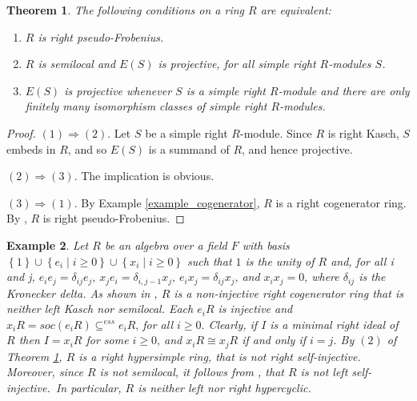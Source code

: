 \documentclass{amsart}
\newtheorem{theorem}{Theorem}[section]
\theoremstyle{plain}
\newtheorem{example}[theorem]{Example}
\numberwithin{equation}{section}
\begin{document}
\begin{theorem}
\label{Pseudo-Frobenius Rings in terms of E(S) being projective}
The following conditions on a ring $R$ are equivalent: 


\begin{enumerate}
\item $R$ is right pseudo-Frobenius.

\item $R$ is semilocal and $E (S)$ is projective, for all simple right $R$-modules $S$.

\item $E (S)$ is projective whenever $S$ is a simple right $R$-module and there are only finitely many isomorphism classes of simple right $R$-modules. \end{enumerate}
\end{theorem}


\begin{proof}
$(1) \Rightarrow (2)$. Let $S$ be a simple right $R$-module. Since $R$ is right Kasch, $S$ embeds in $R$, and so $E (S)$ is a summand of $R$, and hence projective. 

$(2) \Rightarrow (3)$. The implication is obvious. 

$(3) \Rightarrow (1)$. By Example \ref{example_cogenerator}, $R$ is a right cogenerator ring. By \cite[Theorem 19.25]{Lam},
$R$ is right pseudo-Frobenius. 
\end{proof}


\begin{example}
\cite[Example 2]{O3}\label{Osofsky's Example}
Let $R$ be an algebra over a field $F$ with basis $\left \{1\right \} \cup \left \{e_{i} \mid i \geq 0\right \} \cup \left \{x_{i} \mid i \geq 0\right \}$ such that $1$ is the unity of $R$ and, for all i and j, $e_{i} e_{j} =\delta _{i j} e_{j}\text{,}$ $x_{j} e_{i} =\delta _{i ,j -1} x_{j}\text{,}$ $e_{i} x_{j} =\delta _{i j} x_{j}\text{,}$ and $x_{i} x_{j} =0\text{,}$ where $\delta _{i j}$ is the Kronecker delta. As shown in \cite{O3}, $R$ is a non-injective right cogenerator ring that is neither left Kasch nor semilocal. Each $e_{i} R$ is injective and $x_{i} R =s o c (e_{i} R)  \subseteq ^{e s s}e_{i} R\text{,}$ for all $i \geq 0.$ Clearly, if $I$ is a minimal right ideal of $R$ then $I =x_{i} R$ for some $i \geq 0\text{,}$ and $x_{i} R \cong x_{j} R$ if and only if $i =j$. By $(2)$ of Theorem \ref{Pseudo-Frobenius Rings in terms of E(S) being projective},
$R$ is a right hypersimple ring, that is not right self-injective. Moreover, since $R$ is not semilocal, it follows from \cite[Lemma 4.1]{NY},
that $R$ is not left self-injective.\ In particular, $R$ is neither left nor right hypercyclic. 
\end{example}
\end{document}
